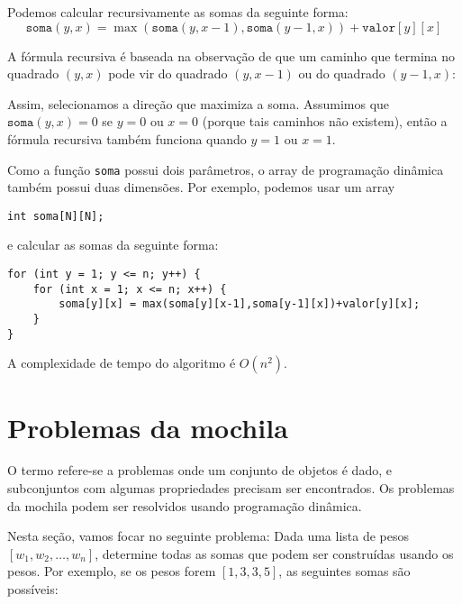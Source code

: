 Podemos calcular recursivamente as somas
da seguinte forma:
\[ \texttt{soma}(y,x) = \max(\texttt{soma}(y,x-1),\texttt{soma}(y-1,x))+\texttt{valor}[y][x]\]


A fórmula recursiva é baseada na observação
de que um caminho que termina no quadrado $(y,x)$
pode vir do quadrado $(y,x-1)$
ou do quadrado $(y-1,x)$:
\begin{center}
\end{center}

Assim, selecionamos a direção que maximiza
a soma.
Assumimos que $\texttt{soma}(y,x)=0$
se $y=0$ ou $x=0$ (porque tais caminhos não existem),
então a fórmula recursiva também funciona quando $y=1$ ou $x=1$.

Como a função \texttt{soma} possui dois parâmetros,
o array de programação dinâmica também possui duas dimensões.
Por exemplo, podemos usar um array
\begin{lstlisting}
int soma[N][N];
\end{lstlisting}
e calcular as somas da seguinte forma:
\begin{lstlisting}
for (int y = 1; y <= n; y++) {
    for (int x = 1; x <= n; x++) {
        soma[y][x] = max(soma[y][x-1],soma[y-1][x])+valor[y][x];
    }
}
\end{lstlisting}
A complexidade de tempo do algoritmo é $O(n^2)$.

\section{Problemas da mochila}


O termo  refere-se a problemas onde
um conjunto de objetos é dado, e
subconjuntos com algumas propriedades
precisam ser encontrados.
Os problemas da mochila podem ser resolvidos
usando programação dinâmica.

Nesta seção, vamos focar no seguinte
problema: Dada uma lista de pesos
$[w_1,w_2,\ldots,w_n]$,
determine todas as
somas que podem ser construídas usando os pesos.
Por exemplo, se os pesos forem
$[1,3,3,5]$, as seguintes somas são possíveis:

